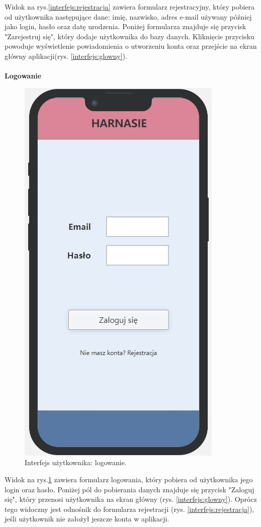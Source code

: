     Widok na rys.\ref{interfejs:rejestracja} zawiera formularz rejestracyjny, który pobiera od użytkownika następujące dane: imię, nazwisko, adres e-mail używany później jako login, hasło oraz datę urodzenia. Poniżej formularza znajduje się przycisk "Zarejestruj się", który dodaje użytkownika do bazy danych. Kliknięcie przycisku powoduje wyświetlenie powiadomienia o utworzeniu konta oraz przejście na ekran główny aplikacji(rys. \ref{interfejs:glowny}). \\
    \\
    \textbf{Logowanie} 
     \begin{figure}[H]
        \centering
        \includegraphics[scale=0.5]{img/interfejsy/if_loguj.jpg}
        \caption{Interfejs użytkownika: logowanie.}
        \label{interfejs:logowanie}
    \end{figure}
    Widok na rys.\ref{interfejs:logowanie} zawiera formularz logowania, który pobiera od użytkownika jego login oraz hasło. Poniżej pól do pobierania danych znajduje się przycisk "Zaloguj się", który przenosi użytkownika na ekran główny (rys. \ref{interfejs:glowny}). Oprócz tego widoczny jest odnośnik do formularza rejestracji (rys. \ref{interfejs:rejestracja}), jeśli użytkownik nie założył jeszcze konta w aplikacji. \\

